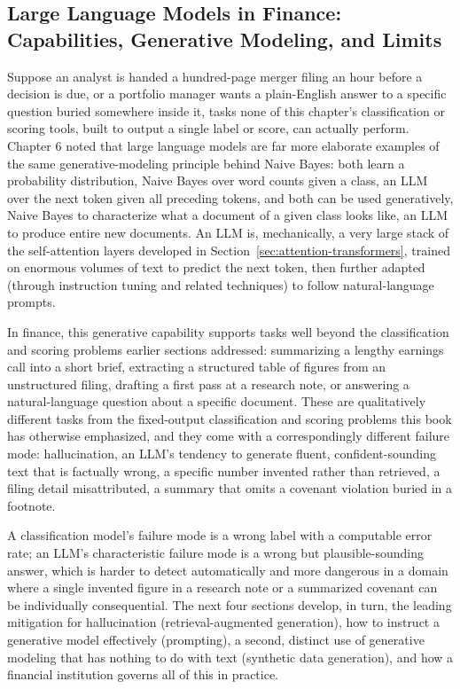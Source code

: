 \documentclass[../ai_in_finance]{subfiles}
\begin{document}
\subsection{Large Language Models in Finance: Capabilities, Generative Modeling, and Limits}
\label{sec:llms-finance}

Suppose an analyst is handed a hundred-page merger filing an hour before a decision is due, or a portfolio manager wants a plain-English answer to a specific question buried somewhere inside it, tasks none of this chapter's classification or scoring tools, built to output a single label or score, can actually perform. Chapter 6 noted that large language models are far more elaborate examples of the same generative-modeling principle behind Naive Bayes: both learn a probability distribution, Naive Bayes over word counts given a class, an LLM over the next token given all preceding tokens, and both can be used generatively, Naive Bayes to characterize what a document of a given class looks like, an LLM to produce entire new documents. An LLM is, mechanically, a very large stack of the self-attention layers developed in Section~\ref{sec:attention-transformers}, trained on enormous volumes of text to predict the next token, then further adapted (through instruction tuning and related techniques) to follow natural-language prompts.

In finance, this generative capability supports tasks well beyond the classification and scoring problems earlier sections addressed: summarizing a lengthy earnings call into a short brief, extracting a structured table of figures from an unstructured filing, drafting a first pass at a research note, or answering a natural-language question about a specific document. These are qualitatively different tasks from the fixed-output classification and scoring problems this book has otherwise emphasized, and they come with a correspondingly different failure mode: hallucination, an LLM's tendency to generate fluent, confident-sounding text that is factually wrong, a specific number invented rather than retrieved, a filing detail misattributed, a summary that omits a covenant violation buried in a footnote.

A classification model's failure mode is a wrong label with a computable error rate; an LLM's characteristic failure mode is a wrong but plausible-sounding answer, which is harder to detect automatically and more dangerous in a domain where a single invented figure in a research note or a summarized covenant can be individually consequential. The next four sections develop, in turn, the leading mitigation for hallucination (retrieval-augmented generation), how to instruct a generative model effectively (prompting), a second, distinct use of generative modeling that has nothing to do with text (synthetic data generation), and how a financial institution governs all of this in practice.
\end{document}
